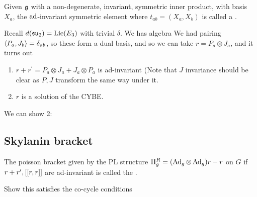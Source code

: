 \documentclass{article}
\begin{document}
\begin{definition}
Given $\mf{g}$ with a non-degenerate, invariant, symmetric inner product, with basis $X_a$, the $\ad$-invariant symmetric element 
where $t_{ab} = (X_a, X_b)$ is called a . 
\end{definition}

\begin{example}
Recall $d(\mf{su}_2) = \Lie(E_3)$ with trivial $\delta$. We has algebra 
We had pairing $\pangle{P_a,J_b} = \delta_{ab}$, so these form a dual basis, and so we can take $r = P_a \otimes J_a$, and it turns out 
\begin{enumerate}
    \item $r + r^\prime = P_a \otimes J_a + J_a \otimes P_a$ is ad-invariant (Note that $J$ invariance should be clear as $P,J$ transform the same way under it.
    \item $r$ is a solution of the CYBE. 
\end{enumerate}
We can show 2: 
\end{example}

\subsection{Skylanin bracket}

\begin{definition} The poisson bracket given by the PL structure $\Pi^R_g = (\Ad_g \otimes \Ad_g)r - r$  on $G$ if $r+ r^\prime, \dcomm[r]{r}$ are ad-invariant is called the .  
\end{definition}

\begin{ex}
Show this satisfies the co-cycle conditions 
\end{ex}
\end{document}
